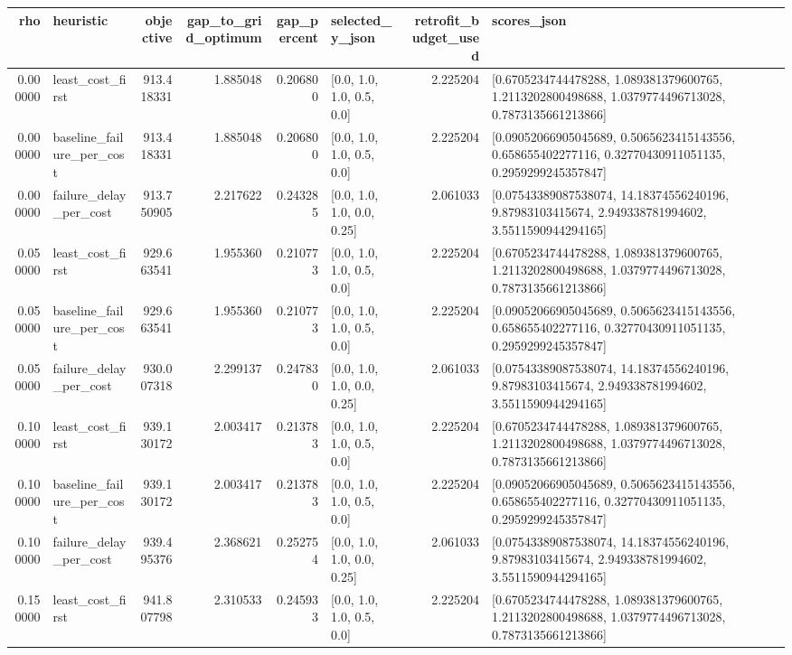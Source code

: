 \begin{tabular}{rlrrrlrl}
\toprule
rho & heuristic & objective & gap\_to\_grid\_optimum & gap\_percent & selected\_y\_json & retrofit\_budget\_used & scores\_json \\
\midrule
0.000000 & least\_cost\_first & 913.418331 & 1.885048 & 0.206800 & [0.0, 1.0, 1.0, 0.5, 0.0] & 2.225204 & [0.6705234744478288, 1.089381379600765, 1.2113202800498688, 1.0379774496713028, 0.7873135661213866] \\
0.000000 & baseline\_failure\_per\_cost & 913.418331 & 1.885048 & 0.206800 & [0.0, 1.0, 1.0, 0.5, 0.0] & 2.225204 & [0.09052066905045689, 0.5065623415143556, 0.658655402277116, 0.32770430911051135, 0.2959299245357847] \\
0.000000 & failure\_delay\_per\_cost & 913.750905 & 2.217622 & 0.243285 & [0.0, 1.0, 1.0, 0.0, 0.25] & 2.061033 & [0.07543389087538074, 14.18374556240196, 9.87983103415674, 2.949338781994602, 3.5511590944294165] \\
0.050000 & least\_cost\_first & 929.663541 & 1.955360 & 0.210773 & [0.0, 1.0, 1.0, 0.5, 0.0] & 2.225204 & [0.6705234744478288, 1.089381379600765, 1.2113202800498688, 1.0379774496713028, 0.7873135661213866] \\
0.050000 & baseline\_failure\_per\_cost & 929.663541 & 1.955360 & 0.210773 & [0.0, 1.0, 1.0, 0.5, 0.0] & 2.225204 & [0.09052066905045689, 0.5065623415143556, 0.658655402277116, 0.32770430911051135, 0.2959299245357847] \\
0.050000 & failure\_delay\_per\_cost & 930.007318 & 2.299137 & 0.247830 & [0.0, 1.0, 1.0, 0.0, 0.25] & 2.061033 & [0.07543389087538074, 14.18374556240196, 9.87983103415674, 2.949338781994602, 3.5511590944294165] \\
0.100000 & least\_cost\_first & 939.130172 & 2.003417 & 0.213783 & [0.0, 1.0, 1.0, 0.5, 0.0] & 2.225204 & [0.6705234744478288, 1.089381379600765, 1.2113202800498688, 1.0379774496713028, 0.7873135661213866] \\
0.100000 & baseline\_failure\_per\_cost & 939.130172 & 2.003417 & 0.213783 & [0.0, 1.0, 1.0, 0.5, 0.0] & 2.225204 & [0.09052066905045689, 0.5065623415143556, 0.658655402277116, 0.32770430911051135, 0.2959299245357847] \\
0.100000 & failure\_delay\_per\_cost & 939.495376 & 2.368621 & 0.252754 & [0.0, 1.0, 1.0, 0.0, 0.25] & 2.061033 & [0.07543389087538074, 14.18374556240196, 9.87983103415674, 2.949338781994602, 3.5511590944294165] \\
0.150000 & least\_cost\_first & 941.807798 & 2.310533 & 0.245933 & [0.0, 1.0, 1.0, 0.5, 0.0] & 2.225204 & [0.6705234744478288, 1.089381379600765, 1.2113202800498688, 1.0379774496713028, 0.7873135661213866] \\

\end{tabular}
